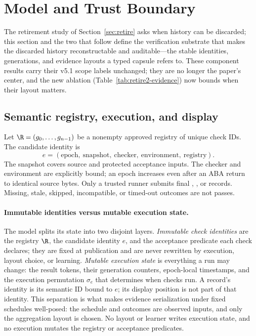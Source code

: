 \section{Model and Trust Boundary}\label{sec:model}
The retirement study of Section~\ref{sec:retire} asks when history can
be discarded; this section and the two that follow define the
verification substrate that makes the discarded history
reconstructable and auditable---the stable identities, generations,
and evidence layouts a typed capsule refers to. These component
results carry their v5.1 scope labels unchanged; they are no longer
the paper's center, and the new ablation
(Table~\ref{tab:retire2-evidence}) now bounds when their layout matters.
\subsection{Semantic registry, execution, and display}\label{sec:registry}
Let $\R=(g_0,\ldots,g_{n-1})$ be a nonempty approved registry of unique check
IDs. The candidate identity is
\begin{equation}e=( \text{epoch},\ \text{snapshot},\ \text{checker},\ \text{environment},\ \text{registry}).\end{equation}
The snapshot covers source and protected acceptance inputs. The checker and
environment are explicitly bound; an epoch increases even after an ABA return to
identical source bytes. Only a trusted runner submits final \PASS{}, \FAIL{}, or
\UNKNOWN{} records. Missing, stale, skipped, incompatible, or timed-out outcomes
are not passes.

\paragraph{Immutable identities versus mutable execution state.}
The model splits its state into two disjoint layers.
\emph{Immutable check identities} are the registry $\R$, the candidate
identity $e$, and the acceptance predicate each check declares; they are fixed
at publication and are never rewritten by execution, layout choice, or
learning. \emph{Mutable execution state} is everything a run may change: the
result tokens, their generation counters, epoch-local timestamps, and the
execution permutation $\sigma_e$ that determines when checks run. A record's
identity is its semantic ID bound to $e$; its display position is not part of
that identity. This separation is what makes evidence serialization under
fixed schedules well-posed: the schedule and outcomes are observed inputs, and
only the aggregation layout is chosen. No layout or learner writes execution
state, and no execution mutates the registry or acceptance predicates.

